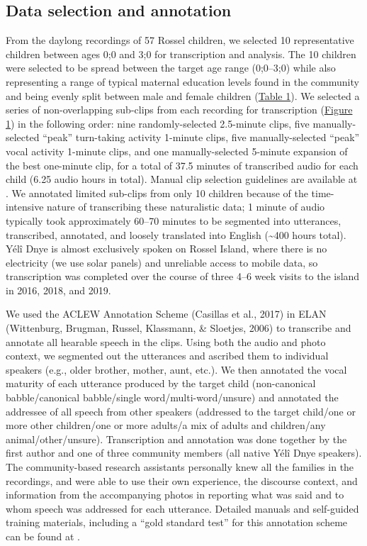 \documentclass[,man,floatsintext]{apa6}
\begin{document}
\subsection{Data selection and annotation}\label{methods-samples}

From the daylong recordings of 57 Rossel children, we selected 10
representative children between ages 0;0 and 3;0 for transcription and
analysis. The 10 children were selected to be spread between the target
age range (0;0--3;0) while also representing a range of typical maternal
education levels found in the community and being evenly split between
male and female children (\protect\hyperlink{tab1}{Table 1}). We
selected a series of non-overlapping sub-clips from each recording for
transcription (\protect\hyperlink{fig1}{Figure 1}) in the following
order: nine randomly-selected 2.5-minute clips, five manually-selected
\enquote{peak} turn-taking activity 1-minute clips, five
manually-selected \enquote{peak} vocal activity 1-minute clips, and one
manually-selected 5-minute expansion of the best one-minute clip, for a
total of 37.5 minutes of transcribed audio for each child (6.25 audio
hours in total). Manual clip selection guidelines are available at . We
annotated limited sub-clips from only 10 children because of the
time-intensive nature of transcribing these naturalistic data; 1 minute
of audio typically took approximately 60--70 minutes to be segmented
into utterances, transcribed, annotated, and loosely translated into
English (\textasciitilde{}400 hours total). Yélî Dnye is almost
exclusively spoken on Rossel Island, where there is no electricity (we
use solar panels) and unreliable access to mobile data, so transcription
was completed over the course of three 4--6 week visits to the island in
2016, 2018, and 2019.

We used the ACLEW Annotation Scheme (Casillas et al., 2017) in ELAN
(Wittenburg, Brugman, Russel, Klassmann, \& Sloetjes, 2006) to
transcribe and annotate all hearable speech in the clips. Using both the
audio and photo context, we segmented out the utterances and ascribed
them to individual speakers (e.g., older brother, mother, aunt, etc.).
We then annotated the vocal maturity of each utterance produced by the
target child (non-canonical babble/canonical babble/single
word/multi-word/unsure) and annotated the addressee of all speech from
other speakers (addressed to the target child/one or more other
children/one or more adults/a mix of adults and children/any
animal/other/unsure). Transcription and annotation was done together by
the first author and one of three community members (all native Yélî
Dnye speakers). The community-based research assistants personally knew
all the families in the recordings, and were able to use their own
experience, the discourse context, and information from the accompanying
photos in reporting what was said and to whom speech was addressed for
each utterance. Detailed manuals and self-guided training materials,
including a \enquote{gold standard test} for this annotation scheme can
be found at .
\end{document}
